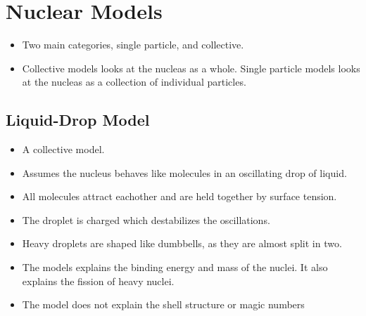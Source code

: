 \section{Nuclear Models}
\begin{itemize}
    \item Two main categories, single particle, and collective. 
    \item Collective models looks at the nucleas as a whole. Single particle models looks at the nucleas as a collection of individual particles.
\end{itemize}

\subsection{Liquid-Drop Model}
\begin{itemize} 
    \item A collective model. 
    \item Assumes the nucleus behaves like molecules in an oscillating drop of liquid.
    \item All molecules attract eachother and are held together by surface tension. 
    \item The droplet is charged which destabilizes the oscillations. 
    \item Heavy droplets are shaped like dumbbells, as they are almost split in two. 
    \item The models explains the binding energy and mass of the nuclei. It also explains the fission of heavy nuclei.
    \item The model does not explain the shell structure or magic numbers  
\end{itemize}

